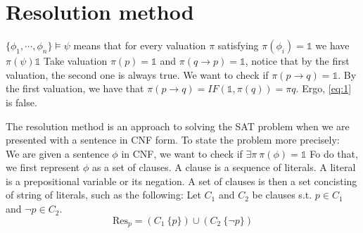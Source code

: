 
\chapter{Resolution method}


{
        $\{ \phi_1,\cdots , \phi_n \} \vDash  \psi$  means that for every valuation $ \pi $ satisfying $\pi(\phi_i) = \mathbb{1}$ we have $\pi(\psi) \mathbb{1}$ 
}
{
Take valuation $\pi(p) = \mathbb{1}$ and $\pi(q \rightarrow p) = \mathbb{1}$, notice that by the first valuation, the second one is always true.
We want to check if $\pi( p \rightarrow q) = \mathbb{1}$. By the first valuation, we have that  $\pi(p \rightarrow q) = IF(\mathbb{1},\pi(q)) = \pi{q}$.
Ergo, \ref{eq:1} is false.
}

The resolution method is an approach to solving the SAT problem when we are presented with a sentence in CNF form. To state the problem more precisely:\\
We are given a sentence $\phi$ in CNF, we want to check if  $\exists \pi \: \pi(\phi) = \mathbb{1}$ 
Fo do that, we first represent $\phi$ as a set of clauses.
{
        A clause is a sequence of literals. A literal is a prepositional variable or its negation. A set of clauses is then a set concisting of string of literals, such as the following: 
}
{
        Let $C_1$ and $C_2$ be clauses s.t. $p \in C_1$ and $\neg p \in C_2$.
       \begin{equation} \label{res:1}
        \mathrm{Res}_p = (C_1\ \{p\})\cup(C_2 \ \{\neg p\})
       \end{equation}
}

